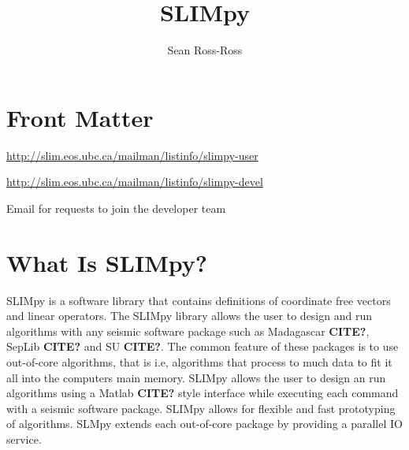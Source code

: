 \documentclass{manual}
\author{Sean Ross-Ross }
\title{SLIMpy}
\begin{document}
\maketitle


\ifhtml
\chapter*{Front Matter \label{front}}
\fi

\begin{definitions}

\url{http://slim.eos.ubc.ca/mailman/listinfo/slimpy-user}


\url{http://slim.eos.ubc.ca/mailman/listinfo/slimpy-devel}


Email 
 for requests to join the developer team


\end{definitions}






\chapter{ What Is SLIMpy? }

SLIMpy is a software library that contains definitions of coordinate free vectors and  linear
operators. The SLIMpy library allows the user to design and run algorithms with any seismic software 
package such as Madagascar \textbf{CITE?}, SepLib \textbf{CITE?} and SU \textbf{CITE?}. 
The common feature of these packages is to use out-of-core 
algorithms, that is i.e, algorithms that process  
to much data to fit it all into the computers main memory. SLIMpy allows the user to design an run algorithms using a Matlab \textbf{CITE?} 
style interface while executing each command with a seismic software package.
SLIMpy allows for flexible and fast prototyping of algorithms.
SLMpy extends each out-of-core package by
providing a parallel IO service.
\end{document}

